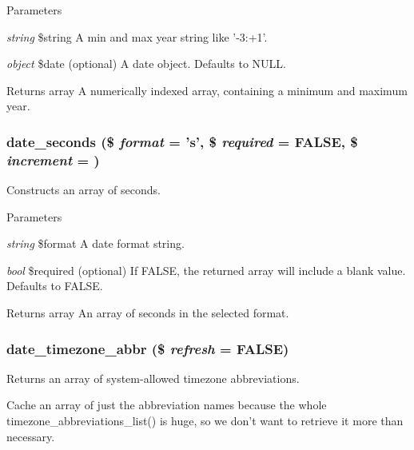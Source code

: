 \begin{DoxyParams}{Parameters}
\item[{\em string}]\$string A min and max year string like '-\/3:+1'. \item[{\em object}]\$date (optional) A date object. Defaults to NULL.\end{DoxyParams}
\begin{DoxyReturn}{Returns}
array A numerically indexed array, containing a minimum and maximum year. 
\end{DoxyReturn}
\hypertarget{date__api_8module_aa5d254f03ee4a981113f8f9874d2915c}{
\subsubsection[{date\_\-seconds}]{\setlength{\rightskip}{0pt plus 5cm}date\_\-seconds (\$ {\em format} = {\ttfamily 's'}, \/  \$ {\em required} = {\ttfamily FALSE}, \/  \$ {\em increment} = {})}}
\label{date__api_8module_aa5d254f03ee4a981113f8f9874d2915c}
Constructs an array of seconds.


\begin{DoxyParams}{Parameters}
\item[{\em string}]\$format A date format string. \item[{\em bool}]\$required (optional) If FALSE, the returned array will include a blank value. Defaults to FALSE.\end{DoxyParams}
\begin{DoxyReturn}{Returns}
array An array of seconds in the selected format. 
\end{DoxyReturn}
\hypertarget{date__api_8module_acc8ac7f6a9a71d3f679af4d130a97843}{
\subsubsection[{date\_\-timezone\_\-abbr}]{\setlength{\rightskip}{0pt plus 5cm}date\_\-timezone\_\-abbr (\$ {\em refresh} = {\ttfamily FALSE})}}
\label{date__api_8module_acc8ac7f6a9a71d3f679af4d130a97843}
Returns an array of system-\/allowed timezone abbreviations.

Cache an array of just the abbreviation names because the whole timezone\_\-abbreviations\_\-list() is huge, so we don't want to retrieve it more than necessary.


